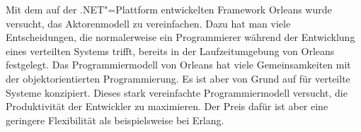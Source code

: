 Mit dem auf der .NET"=Plattform entwickelten Framework Orleans wurde versucht, das Aktorenmodell zu vereinfachen. Dazu hat man viele Entscheidungen, die normalerweise ein Programmierer während der Entwicklung eines verteilten Systems trifft, bereits in der Laufzeitumgebung von Orleans festgelegt. Das Programmiermodell von Orleans hat viele Gemeinsamkeiten mit der objektorientierten Programmierung. Es ist aber von Grund auf für verteilte Systeme konzipiert. Dieses stark vereinfachte Programmiermodell versucht, die Produktivität der Entwickler zu maximieren. Der Preis dafür ist aber eine geringere Flexibilität als beispielsweise bei Erlang.